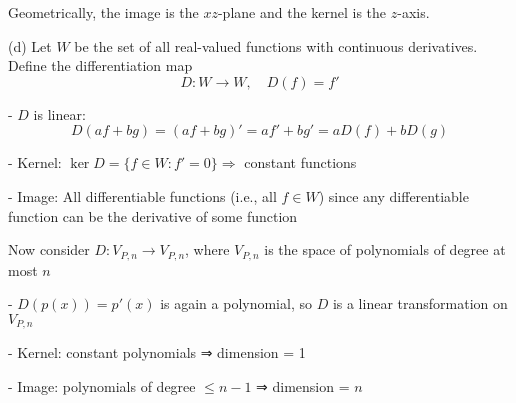 \documentclass[12pt]{article}
\begin{document}
\begin{enumerate}
Geometrically, the image is the \( xz \)-plane and the kernel is the \( z \)-axis.

(d) Let \( W \) be the set of all real-valued functions with continuous derivatives. Define the differentiation map
\[
D: W \to W, \quad D(f) = f'
\]

- \( D \) is linear:
  \[
  D(af + bg) = (af + bg)' = a f' + b g' = a D(f) + b D(g)
  \]

- Kernel: \( \ker D = \{ f \in W : f' = 0 \} \Rightarrow \) constant functions

- Image: All differentiable functions (i.e., all \( f \in W \)) since any differentiable function can be the derivative of some function

Now consider \( D : V_{P,n} \to V_{P,n} \), where \( V_{P,n} \) is the space of polynomials of degree at most \( n \)

- \( D(p(x)) = p'(x) \) is again a polynomial, so \( D \) is a linear transformation on \( V_{P,n} \)

- Kernel: constant polynomials ⇒ dimension = 1

- Image: polynomials of degree \( \leq n-1 \) ⇒ dimension = \( n \)


\end{enumerate}
\end{document}
